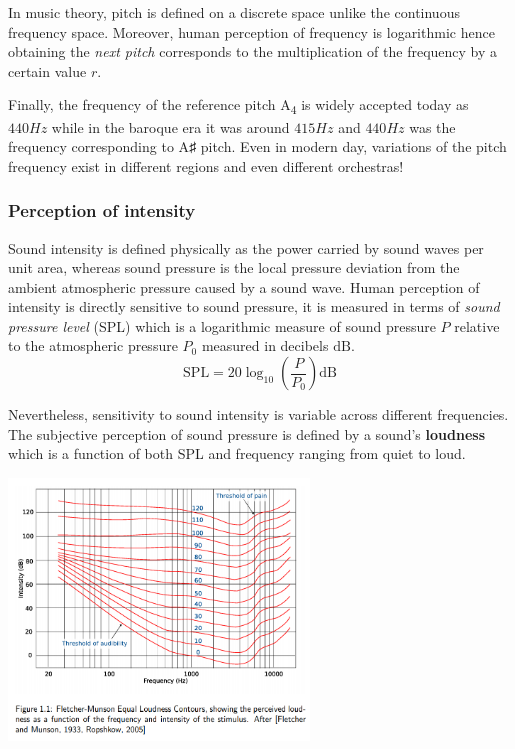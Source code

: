\documentclass[
  american,
]{article}
\begin{document}
In music theory, pitch is defined on a discrete space
unlike the continuous frequency space.
Moreover, human perception of frequency is logarithmic
hence obtaining the \emph{next pitch} corresponds to the
multiplication of the frequency by a certain value \(r\).

Finally, the frequency of the reference pitch A\textsubscript{4}
is widely accepted today as \(440 Hz\) while in the baroque
era it was around \(415 Hz\) and \(440 Hz\) was the frequency
corresponding to A♯ pitch.
Even in modern day, variations of the pitch frequency
exist in different regions and even different orchestras!

\hypertarget{perception-of-intensity}{%
\subsubsection{Perception of intensity}\label{perception-of-intensity}}

Sound intensity is defined physically as the power carried
by sound waves per unit area, whereas sound pressure is
the local pressure deviation from the ambient atmospheric
pressure caused by a sound wave.
Human perception of intensity is directly sensitive to
sound pressure, it is measured in terms of \emph{sound pressure level} (SPL)
which is a logarithmic measure of sound pressure \(P\)
relative to the atmospheric pressure \(P_0\) measured
in decibels \(\mathrm{dB}\).
\[\mathrm{SPL} = 20\log_{10}\left(\frac{P}{P_0}\right) \mathrm{dB}\]

Nevertheless, sensitivity to sound intensity is variable
across different frequencies.
The subjective perception of sound pressure
is defined by a sound's \textbf{loudness} which is a function of
both SPL and frequency ranging from quiet to loud.

\includegraphics[width=0.6\textwidth,height=\textheight]{img/loudness.png}
\end{document}
